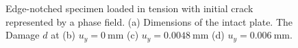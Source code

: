 \begin{figure}[htb!]
\begin{subfigure}[b]{0.06\textwidth}
    \vspace{0.15in}
  \end{subfigure}
  \caption[Edge-notched specimen loaded in tension  with initial crack represented by a phase field.]{ Edge-notched specimen loaded in tension  with initial crack represented by a phase field.  (a) Dimensions of the intact plate. The  Damage $d$ at (b) $u_y = \SI{0}{\milli\meter}$ (c) $u_y = \SI{0.0048}{\milli\meter}$ (d) $u_y = \SI{0.006}{\milli\meter}$. }
  \label{fig: Chapter4/mode1_intact_plate}
\end{figure}
